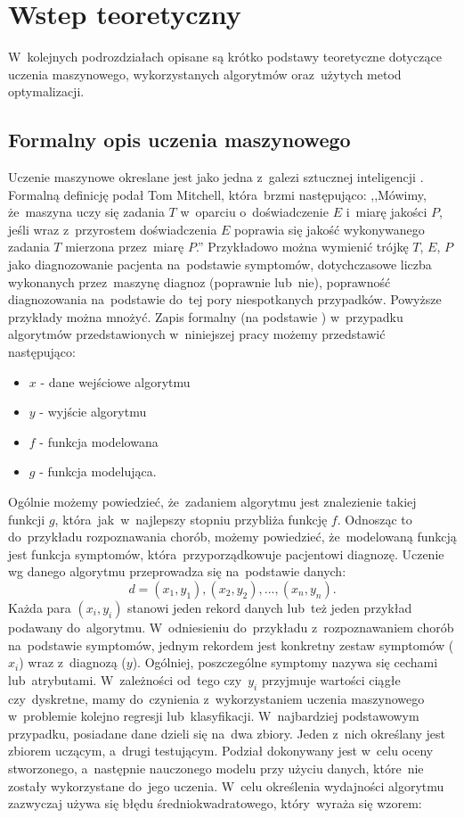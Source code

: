 \section{Wstep teoretyczny} \label{theory}
W~kolejnych podrozdziałach opisane są krótko podstawy teoretyczne dotyczące uczenia maszynowego, wykorzystanych algorytmów oraz~użytych metod optymalizacji.
\subsection{Formalny opis uczenia maszynowego}
Uczenie maszynowe okreslane jest jako jedna z~galezi sztucznej inteligencji \cite{dnn1}. Formalną definicję podał Tom Mitchell, która~brzmi następująco: ,,Mówimy, że~maszyna uczy się zadania $T$ w~oparciu o~doświadczenie $E$ i~miarę jakości $P$, jeśli wraz z~przyrostem doświadczenia $E$ poprawia się jakość wykonywanego zadania $T$ mierzona przez~miarę $P$.''\cite{mitchel} Przykładowo można wymienić trójkę $T$, $E$, $P$ jako diagnozowanie pacjenta na~podstawie symptomów, dotychczasowe  liczba wykonanych przez~maszynę diagnoz (poprawnie lub~nie),  poprawność diagnozowania na~podstawie do~tej pory niespotkanych przypadków. Powyższe przykłady można mnożyć. Zapis formalny (na podstawie \cite{formal2}) w~przypadku algorytmów przedstawionych w~niniejszej pracy możemy przedstawić następująco:
\begin{itemize}
\item $x$ - dane wejściowe algorytmu
\item $y$ - wyjście algorytmu
\item $f$ - funkcja modelowana
\item $g$ - funkcja modelująca.
\end{itemize}
Ogólnie możemy powiedzieć, że~zadaniem algorytmu jest znalezienie takiej funkcji $g$, która~jak~w~najlepszy stopniu przybliża funkcję $f$. Odnosząc to do~przykładu rozpoznawania chorób, możemy powiedzieć, że~modelowaną funkcją jest funkcja symptomów, która~przyporządkowuje pacjentowi diagnozę. Uczenie wg danego algorytmu przeprowadza się na~podstawie danych:
\begin{equation}
d = (x_1,y_1), (x_2, y_2), ..., (x_n, y_n).
\end{equation}
Każda para $(x_i, y_i)$ stanowi jeden rekord danych lub~też jeden przykład podawany do~algorytmu. W~odniesieniu do~przykładu z~rozpoznawaniem chorób na~podstawie symptomów, jednym rekordem jest konkretny zestaw symptomów ($x_i$) wraz z~diagnozą ($y$).  Ogólniej, poszczególne symptomy nazywa się cechami lub~atrybutami. W~zależności od~tego czy~$y_i$ przyjmuje wartości ciągłe czy~dyskretne, mamy do~czynienia z~wykorzystaniem uczenia maszynowego w~problemie kolejno regresji lub~klasyfikacji. W~najbardziej podstawowym przypadku, posiadane dane dzieli się na~dwa zbiory. Jeden z~nich określany jest zbiorem uczącym, a~drugi testującym. Podział dokonywany jest w~celu oceny stworzonego, a~następnie nauczonego modelu przy użyciu danych, które~nie zostały wykorzystane do~jego uczenia. W~celu określenia wydajności algorytmu zazwyczaj używa się błędu średniokwadratowego, który~wyraża się wzorem:
